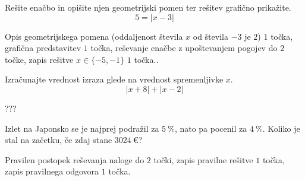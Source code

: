 \documentclass[addpoints,12pt]{exam}
\begin{document}
\begin{questions}
    \question[5]
    Rešite enačbo in opišite njen geometrijski pomen ter rešitev grafično prikažite.
    $$  5=\left\lvert x-3\right\rvert $$
    
    
    \begin{solution}[8cm]
        Opis geometrijskega pomena (oddaljenost števila $x$ od števila $-3$ je $2$) $1$ točka, grafična predstavitev $1$ točka, reševanje enačbe z upoštevanjem pogojev do $2$ točke, zapis rešitve $x\in\{-5,-1\}$ $1$ točka..
    \end{solution}


    \newpage





    \question[5]
    Izračunajte vrednost izraza glede na vrednost spremenljivke $x$.
    $$\left\lvert x+8 \right\rvert + \left\lvert x-2 \right\rvert $$
    
    
    \begin{solution}[10cm]
        ???
    \end{solution}



    
    


\newpage


    \question[4]
    Izlet na Japonsko se je najprej podražil za $5~\%$, nato pa pocenil za $4~\%$. 
    Koliko je stal na začetku, če zdaj stane $3024~€$?
    
    
    \begin{solution}[3cm]
        Pravilen postopek reševanja naloge do $2$ točki, zapis pravilne rešitve $1$ točka, zapis pravilnega odgovora $1$ točka.
    \end{solution}

     \newpage



    

\end{questions}
\end{document}

